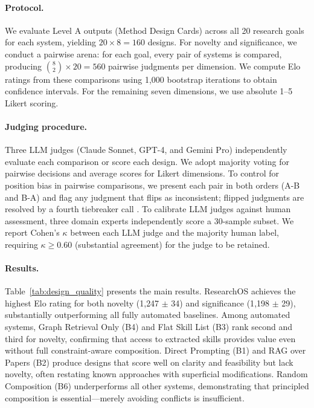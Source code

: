 \paragraph{Protocol.}
We evaluate Level A outputs (Method Design Cards) across all 20 research goals for each system, yielding $20 \times 8 = 160$ designs. For novelty and significance, we conduct a pairwise arena: for each goal, every pair of systems is compared, producing ${8 \choose 2} \times 20 = 560$ pairwise judgments per dimension. We compute Elo ratings \cite{elo1978rating} from these comparisons using 1{,}000 bootstrap iterations to obtain confidence intervals. For the remaining seven dimensions, we use absolute 1--5 Likert scoring.

\paragraph{Judging procedure.}
Three LLM judges (Claude Sonnet, GPT-4, and Gemini Pro) independently evaluate each comparison or score each design. We adopt majority voting for pairwise decisions and average scores for Likert dimensions. To control for position bias in pairwise comparisons, we present each pair in both orders (A-B and B-A) and flag any judgment that flips as inconsistent; flipped judgments are resolved by a fourth tiebreaker call \cite{zheng2024judging}. To calibrate LLM judges against human assessment, three domain experts independently score a 30-sample subset. We report Cohen's $\kappa$ \cite{cohen1960kappa} between each LLM judge and the majority human label, requiring $\kappa \geq 0.60$ (substantial agreement) for the judge to be retained.

\paragraph{Results.}
Table~\ref{tab:design_quality} presents the main results. ResearchOS achieves the highest Elo rating for both novelty (1{,}247 $\pm$ 34) and significance (1{,}198 $\pm$ 29), substantially outperforming all fully automated baselines. Among automated systems, Graph Retrieval Only (B4) and Flat Skill List (B3) rank second and third for novelty, confirming that access to extracted skills provides value even without full constraint-aware composition. Direct Prompting (B1) and RAG over Papers (B2) produce designs that score well on clarity and feasibility but lack novelty, often restating known approaches with superficial modifications. Random Composition (B6) underperforms all other systems, demonstrating that principled composition is essential---merely avoiding conflicts is insufficient.

